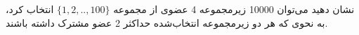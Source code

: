 \p
نشان دهید می‌توان 10000 زیرمجموعه 4 عضوی از مجموعه
$\{1,2,..,100\}$
انتخاب کرد، به نحوی که هر دو زیرمجموعه انتخاب‌شده حداکثر 2 عضو مشترک داشته باشند.